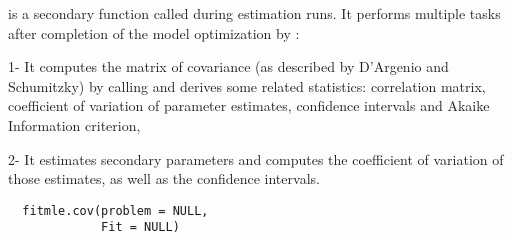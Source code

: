 %
\begin{Description}\relax
{} is a secondary function called during estimation runs. It 
performs multiple tasks after completion of the model optimization by
:

1- It computes the matrix of covariance (as described by D'Argenio and 
Schumitzky) by calling  and derives some related
statistics: correlation matrix, coefficient of variation of parameter
estimates, confidence intervals and Akaike Information criterion,

2- It estimates secondary parameters and computes the coefficient of variation
of those estimates, as well as the confidence intervals.

\end{Description}
%
\begin{Usage}
\begin{verbatim}
  fitmle.cov(problem = NULL,
             Fit = NULL)
\end{verbatim}
\end{Usage}
%
